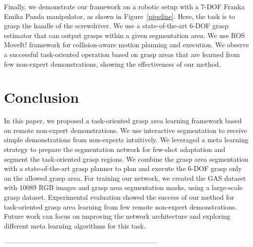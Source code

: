 \documentclass[letterpaper]{article} %
\begin{document}
Finally, we demonstrate our framework on a robotic setup with a 7-DOF Franka Emika Panda manipulator, as shown in Figure~\ref{pipeline}. Here, the task is to grasp the handle of the screwdriver. We use a state-of-the-art 6-DOF grasp estimator \cite{sundermeyer2021contact} that can output grasps within a given segmentation area. We use ROS MoveIt! framework \cite{coleman2014reducing} for collision-aware motion planning and execution. We observe a successful task-oriented operation based on grasp areas that are learned from few non-expert demonstrations, showing the effectiveness of our method.

\section{Conclusion}
\label{sec:conclusion}

In this paper, we proposed a task-oriented grasp area learning framework based on remote non-expert demonstrations. We use interactive segmentation to receive simple demonstrations from non-experts intuitively. We leveraged a meta learning strategy to prepare the segmentation network for few-shot adaptation and segment the task-oriented grasp regions. We combine the grasp area segmentation with a state-of-the-art grasp planner to plan and execute the 6-DOF grasp only on the allowed grasp area. For training our network, we created the GAS dataset with 10089 RGB images and grasp area segmentation masks, using a large-scale grasp dataset. Experimental evaluation showed the success of our method for task-oriented grasp area learning from few remote non-expert demonstrations. Future work can focus on improving the network architecture and exploring different meta learning algorithms for this task.

--------------------------------------------------------------------
\end{document}
